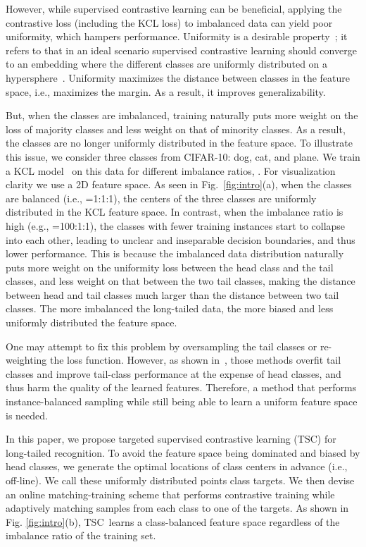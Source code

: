 \documentclass[10pt,twocolumn,letterpaper]{article}
\newcommand{\name} {TSC}
\begin{document}
However, while supervised contrastive learning can be beneficial, applying the contrastive loss (including the KCL loss) to imbalanced data can yield poor uniformity, which hampers performance. Uniformity is a desirable property~\cite{wang2020long}; it refers to that in an ideal scenario supervised contrastive learning should converge to an embedding where the different classes are uniformly distributed on a hypersphere~\cite{wang2020long,graf2021dissecting}. Uniformity maximizes the distance between classes in the feature space, i.e., maximizes the margin. As a result, it improves  generalizability. 

But, when the classes are imbalanced, training naturally puts more weight on the loss of majority classes and less weight on that of minority classes. As a result, the classes are no longer uniformly distributed in the feature space. To illustrate this issue, we consider three classes from CIFAR-10: dog, cat, and plane. We train a KCL model~\cite{kang2020exploring} on this data for different imbalance ratios, . For visualization clarity we use a 2D feature space. As seen in Fig.~\ref{fig:intro}(a), when the classes are balanced (i.e., =1:1:1), the centers of the three classes are uniformly distributed in the KCL feature space. In contrast, when the imbalance ratio is high  (e.g., =100:1:1), the classes with fewer training instances start to collapse into each other, leading to unclear and inseparable decision boundaries, and thus lower performance. This is because the imbalanced data distribution naturally puts more weight on the uniformity loss between the head class and the tail classes, and less weight on that between the two tail classes, making the distance between head and tail classes much larger than the distance between two tail classes. The more imbalanced the long-tailed data, the more biased and less uniformly distributed the feature space.

One may attempt to fix this problem by oversampling the tail classes or re-weighting the loss function. However,  as shown in~\cite{kang2019decoupling}, those methods overfit tail classes and improve tail-class performance at the expense of head classes, and thus harm the quality of the learned features. 
Therefore, a method that performs instance-balanced sampling while still being able to learn a uniform feature space is needed. 

In this paper, we propose targeted supervised contrastive learning (\name) for long-tailed recognition. To avoid the feature space being dominated and biased by head classes, we generate the optimal locations of class centers in advance (i.e., off-line). We call these uniformly distributed points class targets. We then devise 
 an online matching-training scheme that performs contrastive training while adaptively matching samples from each class to one of the targets. As shown in Fig. \ref{fig:intro}(b), \name~learns a class-balanced feature space regardless of the imbalance ratio of the training set.
 
\end{document}

